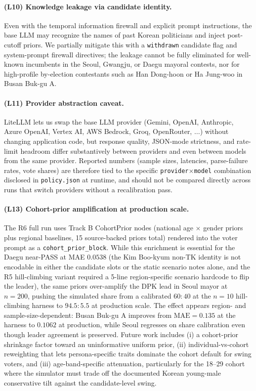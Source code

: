 \documentclass[11pt]{article}
\begin{document}
\paragraph{(L10) Knowledge leakage via candidate identity.}
Even with the temporal information firewall and explicit prompt instructions, the base LLM may recognize the names of past Korean politicians and inject post-cutoff priors. We partially mitigate this with a \texttt{withdrawn} candidate flag and system-prompt firewall directives; the leakage cannot be fully eliminated for well-known incumbents in the Seoul, Gwangju, or Daegu mayoral contests, nor for high-profile by-election contestants such as Han Dong-hoon or Ha Jung-woo in Busan Buk-gu A.

\paragraph{(L11) Provider abstraction caveat.}
LiteLLM lets us swap the base LLM provider (Gemini, OpenAI, Anthropic, Azure OpenAI, Vertex AI, AWS Bedrock, Groq, OpenRouter, $\dots$) without changing application code, but response quality, JSON-mode strictness, and rate-limit headroom differ substantively between providers and even between models from the same provider. Reported numbers (sample sizes, latencies, parse-failure rates, vote shares) are therefore tied to the specific \texttt{provider}$\times$\texttt{model} combination disclosed in \texttt{policy.json} at runtime, and should not be compared directly across runs that switch providers without a recalibration pass.

\paragraph{(L13) Cohort-prior amplification at production scale.}
The R6 full run uses Track B CohortPrior nodes (national age $\times$ gender priors plus regional baselines, 15 source-backed priors total) rendered into the voter prompt as a \texttt{cohort\_prior\_block}. While this enrichment is essential for the Daegu near-PASS at MAE $0.0538$ (the Kim Boo-kyum non-TK identity is not encodable in either the candidate slots or the static scenario notes alone, and the R5 hill-climbing variant required a 5-line region-specific scenario hardcode to flip the leader), the same priors over-amplify the DPK lead in Seoul mayor at $n{=}200$, pushing the simulated share from a calibrated $60{:}40$ at the $n{=}10$ hill-climbing harness to $94.5{:}5.5$ at production scale. The effect appears region- and sample-size-dependent: Busan Buk-gu A improves from $\text{MAE}{=}0.135$ at the harness to $0.1062$ at production, while Seoul regresses on share calibration even though leader agreement is preserved. Future work includes (i) a cohort-prior shrinkage factor toward an uninformative uniform prior, (ii) individual-vs-cohort reweighting that lets persona-specific traits dominate the cohort default for swing voters, and (iii) age-band-specific attenuation, particularly for the 18--29 cohort where the simulator must trade off the documented Korean young-male conservative tilt against the candidate-level swing.
\end{document}
